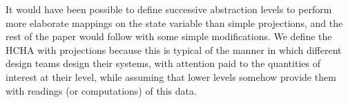 \begin{rem}
	{It would have been possible to define successive abstraction levels to perform more elaborate mappings on the state variable than simple projections, and the rest of the paper would follow with some simple modifications. 
		We define the HCHA with projections because this is typical of the manner in which different design teams design their systems, with attention paid to the quantities of interest at their level, while assuming that lower levels somehow provide them with readings (or computations) of this data.}
\end{rem}


